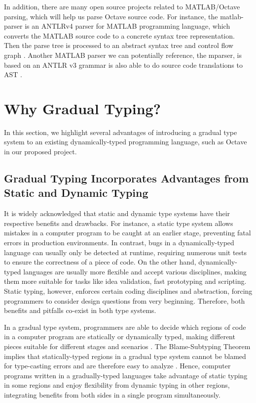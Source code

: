 In addition, there are many open source projects related to MATLAB/Octave parsing, which will help us parse Octave source code. For instance, the matlab-parser is an ANTLRv4 parser for MATLAB programming language, which converts the MATLAB source code to a concrete syntax tree representation. Then the parse tree is processed to an abstract syntax tree and control flow graph \cite{matlabparser1}. Another MATLAB parser we can potentially reference, the mparser, is based on an ANTLR v3 grammar is also able to do source code translations to AST \cite{matlabparser2}.

\section{Why Gradual Typing?}
In this section, we highlight several advantages of introducing a gradual type system to an existing dynamically-typed programming language, such as Octave in our proposed project.

\subsection{Gradual Typing Incorporates Advantages from Static and Dynamic Typing}
It is widely acknowledged that static and dynamic type systems have their respective benefits and drawbacks. For instance, a static type system allows mistakes in a computer program to be caught at an earlier stage, preventing fatal errors in production environments. In contrast, bugs in a dynamically-typed language can usually only be detected at runtime, requiring numerous unit tests to ensure the correctness of a piece of code. On the other hand, dynamically-typed languages are usually more flexible and accept various disciplines, making them more suitable for tasks like idea validation, fast prototyping and scripting. Static typing, however, enforces certain coding disciplines and abstraction, forcing programmers to consider design questions from very beginning. Therefore, both benefits and pitfalls co-exist in both type systems.

In a gradual type system, programmers are able to decide which regions of code in a computer program are statically or dynamically typed, making different pieces suitable for different stages and scenarios \cite{siek2006gradual}. The Blame-Subtyping Theorem implies that statically-typed regions in a gradual type system cannot be blamed for type-casting errors and are therefore easy to analyze \cite{siek2015refined}. Hence, computer programs written in a gradually-typed languages take advantage of static typing in some regions and enjoy flexibility from dynamic typing in other regions, integrating benefits from both sides in a single program simultaneously.

